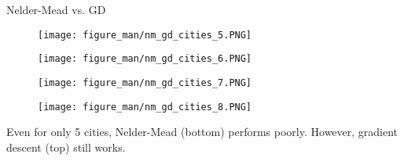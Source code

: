 \documentclass[11pt,compress,t,notes=noshow, xcolor=table]{beamer}
\begin{document}
\begin{vbframe}{Nelder-Mead vs. GD}
\framebreak
\vspace*{-0.8cm}
\begin{figure}
    \centering
    \begin{minipage}{0.45\textwidth}
        \centering
        \texttt{[image: figure\_man/nm\_gd\_cities\_5.PNG]}
    \end{minipage}\hfill
    \begin{minipage}{0.45\textwidth}
        \centering
        \texttt{[image: figure\_man/nm\_gd\_cities\_6.PNG]}
    \end{minipage}
\end{figure}
\begin{figure}
    \centering
    \begin{minipage}{0.45\textwidth}
        \centering
        \texttt{[image: figure\_man/nm\_gd\_cities\_7.PNG]}
    \end{minipage}\hfill
    \begin{minipage}{0.45\textwidth}
        \centering
        \texttt{[image: figure\_man/nm\_gd\_cities\_8.PNG]}
    \end{minipage}
\end{figure}
\vspace*{0.5cm}
\begin{footnotesize}
    Even for only 5 cities, Nelder-Mead (bottom) performs poorly.
    However, gradient descent (top) still works.
\end{footnotesize}

\end{vbframe}



\end{document}
